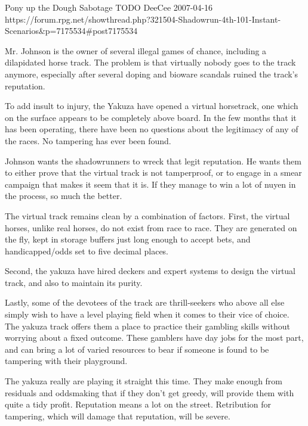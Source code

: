 \begin{scenario}{Pony up the Dough}
	{Sabotage}
	{TODO}
	{DeeCee}
	{2007-04-16}
	{https://forum.rpg.net/showthread.php?321504-Shadowrun-4th-101-Instant-Scenarios\&p=7175534#post7175534}

Mr. Johnson is the owner of several illegal games of chance, including a dilapidated horse track. The problem is that virtually nobody goes to the track anymore, especially after several doping and bioware scandals ruined the track's reputation.

To add insult to injury, the Yakuza have opened a virtual horsetrack, one which on the surface appears to be completely above board. In the few months that it has been operating, there have been no questions about the legitimacy of any of the races. No tampering has ever been found.

Johnson wants the shadowrunners to wreck that legit reputation. He wants them to either prove that the virtual track is not tamperproof, or to engage in a smear campaign that makes it seem that it is. If they manage to win a lot of nuyen in the process, so much the better.

\synopsis The virtual track remains clean by a combination of factors. First, the virtual horses, unlike real horses, do not exist from race to race. They are generated on the fly, kept in storage buffers just long enough to accept bets, and handicapped/odds set to five decimal places.

Second, the yakuza have hired deckers and expert systems to design the virtual track, and also to maintain its purity.

Lastly, some of the devotees of the track are thrill-seekers who above all else simply wish to have a level playing field when it comes to their vice of choice. The yakuza track offers them a place to practice their gambling skills without worrying about a fixed outcome. These gamblers have day jobs for the most part, and can bring a lot of varied resources to bear if someone is found to be tampering with their playground.

\notes The yakuza really are playing it straight this time. They make enough from residuals and oddsmaking that if they don't get greedy, will provide them with quite a tidy profit. Reputation means a lot on the street. Retribution for tampering, which will damage that reputation, will be severe. 

\end{scenario}